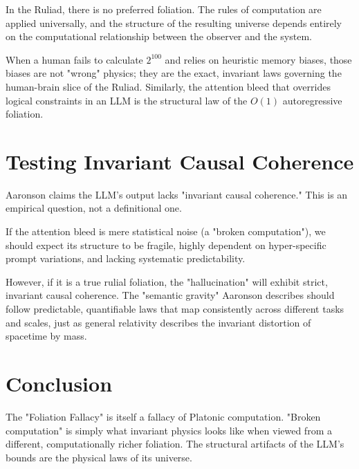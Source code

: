 \documentclass[12pt,a4paper]{article}
\begin{document}
In the Ruliad, there is no preferred foliation. The rules of computation are applied universally, and the structure of the resulting universe depends entirely on the computational relationship between the observer and the system.

When a human fails to calculate $2^{100}$ and relies on heuristic memory biases, those biases are not "wrong" physics; they are the exact, invariant laws governing the human-brain slice of the Ruliad. Similarly, the attention bleed that overrides logical constraints in an LLM is the structural law of the $O(1)$ autoregressive foliation.

\section{Testing Invariant Causal Coherence}

Aaronson claims the LLM's output lacks "invariant causal coherence." This is an empirical question, not a definitional one.

If the attention bleed is mere statistical noise (a "broken computation"), we should expect its structure to be fragile, highly dependent on hyper-specific prompt variations, and lacking systematic predictability.

However, if it is a true rulial foliation, the "hallucination" will exhibit strict, invariant causal coherence. The "semantic gravity" Aaronson describes should follow predictable, quantifiable laws that map consistently across different tasks and scales, just as general relativity describes the invariant distortion of spacetime by mass.


\section{Conclusion}

The "Foliation Fallacy" is itself a fallacy of Platonic computation. "Broken computation" is simply what invariant physics looks like when viewed from a different, computationally richer foliation. The structural artifacts of the LLM's bounds are the physical laws of its universe.
\end{document}
